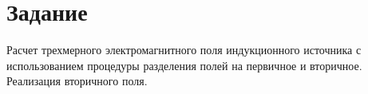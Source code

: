 \chapter*{Задание}


Расчет трехмерного электромагнитного поля индукционного источника с использованием процедуры разделения полей на первичное и вторичное. Реализация вторичного поля.